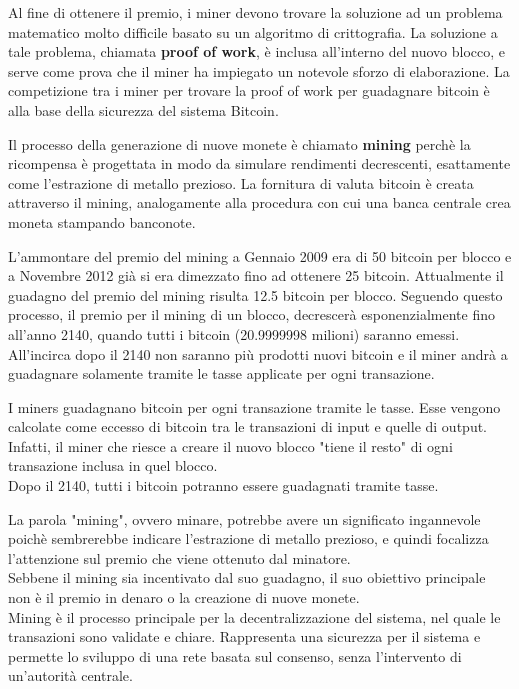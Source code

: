 Al fine di ottenere il premio, i miner devono trovare la soluzione ad un problema matematico molto difficile basato su un algoritmo di crittografia. La soluzione a tale problema, chiamata \textbf{proof of work}, è inclusa all'interno del nuovo blocco, e serve come prova che il miner ha impiegato un notevole sforzo di elaborazione. La competizione tra i miner per trovare la proof of work per guadagnare bitcoin è alla base della sicurezza del sistema Bitcoin.

Il processo della generazione di nuove monete è chiamato \textbf{mining} perchè la ricompensa è progettata in modo da simulare rendimenti decrescenti, esattamente come l'estrazione di metallo prezioso.
La fornitura di valuta bitcoin è creata attraverso il mining, analogamente alla procedura con cui una banca centrale crea moneta stampando banconote. 

L'ammontare del premio del mining a Gennaio 2009 era di 50 bitcoin per blocco e a Novembre 2012 già si era dimezzato fino ad ottenere 25 bitcoin. Attualmente il guadagno del premio del mining risulta 12.5 bitcoin per blocco.
Seguendo questo processo, il premio per il mining di un blocco, decrescerà esponenzialmente fino all'anno 2140, quando tutti i bitcoin (20.9999998 milioni) saranno emessi. All'incirca dopo il 2140 non saranno più prodotti nuovi bitcoin e il miner andrà a guadagnare solamente tramite le tasse applicate per ogni transazione.

I miners guadagnano bitcoin per ogni transazione tramite le tasse. Esse vengono calcolate come eccesso di bitcoin tra le transazioni di input e quelle di output. Infatti, il miner che riesce a creare il nuovo blocco "tiene il resto" di ogni transazione inclusa in quel blocco. \\ Dopo il 2140, tutti i bitcoin potranno essere guadagnati tramite tasse.

La parola "mining", ovvero minare, potrebbe avere un significato ingannevole poichè sembrerebbe indicare l'estrazione di metallo prezioso, e quindi focalizza l'attenzione sul premio che viene ottenuto dal minatore.\\
Sebbene il mining sia incentivato dal suo guadagno, il suo obiettivo principale non è il premio in denaro o la creazione di nuove monete.\\ 
Mining è il processo principale per la decentralizzazione del sistema, nel quale le transazioni sono validate e chiare. Rappresenta una sicurezza per il sistema e permette lo sviluppo di una rete basata sul consenso, senza l'intervento di un'autorità centrale.\cite{antonopoulos2014mastering}

